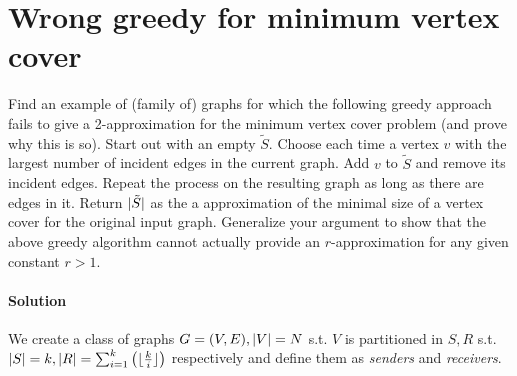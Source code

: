 \section{Wrong greedy for minimum vertex cover}

Find an example of (family of) graphs for which the following greedy approach fails to give a 2-approximation for the minimum vertex cover problem (and prove why this is so). 
Start out with an empty $\tilde{S}$.
Choose each time a vertex $v$ with the largest number of incident edges in the current graph.
Add $v$ to $\tilde{S}$ and remove its incident edges.
Repeat the process on the resulting graph as long as there are edges in it.
Return $\lvert\tilde{S}\rvert$ as the a approximation of the minimal size of a vertex cover for the original input graph.
Generalize your argument to show that the above greedy algorithm cannot actually provide an $r$-approximation for any given constant $r >1$.

\paragraph{Solution}
We create a class of graphs $G = (V, E), \lvert V\rvert = N$ s.t. $V$ is partitioned in $S, R$ s.t. $\lvert S\rvert = k, \lvert R\rvert = \sum_{i = 1}^{k} \left(\lfloor{\frac{k}{i}} \rfloor \right)$ respectively and define them as \emph{senders} and \emph{receivers}.

